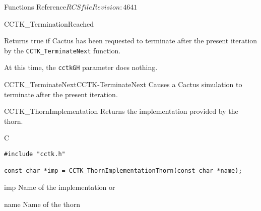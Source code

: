 \begin{cactuspart}{ Functions Reference}{$RCSfile$}{$Revision: 4641 $}
\begin{FunctionDescription}{CCTK\_TerminationReached}
\begin{Discussion}
Returns true if Cactus has been requested to terminate after the present
iteration by the {\tt CCTK\_TerminateNext} function.

At this time, the {\tt cctkGH} parameter does nothing.
\end{Discussion}
\begin{SeeAlsoSection}
\begin{SeeAlso2}{CCTK\_TerminateNext}{CCTK-TerminateNext}
  Causes a Cactus simulation to terminate after the present iteration.
\end{SeeAlso2}
\end{SeeAlsoSection}
\end{FunctionDescription}


\begin{FunctionDescription}{CCTK\_ThornImplementation}
\label{CCTK-ThornImplementation}
Returns the implementation provided by the thorn.

\begin{SynopsisSection}
\begin{Synopsis}{C}
\begin{verbatim}
#include "cctk.h"

const char *imp = CCTK_ThornImplementationThorn(const char *name);
\end{verbatim}
\end{Synopsis}
\end{SynopsisSection}

\begin{ResultSection}
\begin{Result}{imp}
Name of the implementation or 
\end{Result}
\end{ResultSection}

\begin{ParameterSection}
\begin{Parameter}{name}
Name of the thorn
\end{Parameter}
\end{ParameterSection}



\end{FunctionDescription}
\end{cactuspart}

